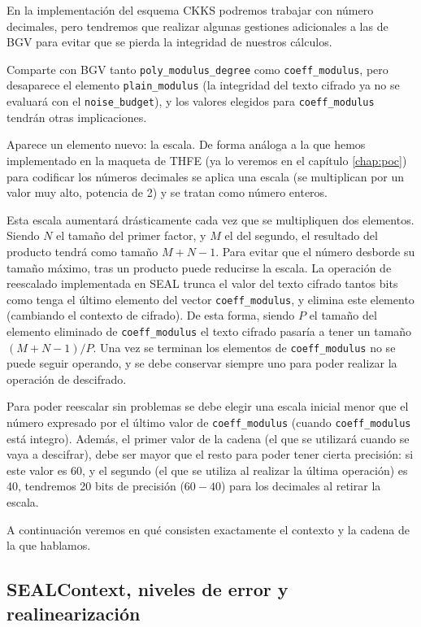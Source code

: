 En la implementación del esquema CKKS podremos trabajar con número decimales, pero tendremos que realizar algunas gestiones adicionales a las de BGV para evitar que se pierda la integridad de nuestros cálculos.

Comparte con BGV tanto \verb|poly_modulus_degree| como \verb|coeff_modulus|, pero desaparece el elemento \verb|plain_modulus| (la integridad del texto cifrado ya no se evaluará con el \verb|noise_budget|), y los valores elegidos para \verb|coeff_modulus| tendrán otras implicaciones.

Aparece un elemento nuevo: la escala. De forma análoga a la que hemos implementado en la maqueta de THFE (ya lo veremos en el capítulo \ref{chap:poc}) para codificar los números decimales se aplica una escala (se multiplican por un valor muy alto, potencia de 2) y se tratan como número enteros.

Esta escala aumentará drásticamente cada vez que se multipliquen dos elementos. Siendo $N$ el tamaño del primer factor, y $M$ el del segundo, el resultado del producto tendrá como tamaño $M+N-1$. Para evitar que el número desborde su tamaño máximo, tras un producto puede reducirse la escala. La operación de reescalado implementada en SEAL trunca el valor del texto cifrado tantos bits como tenga el último elemento del vector \verb|coeff_modulus|, y elimina este elemento (cambiando el contexto de cifrado). De esta forma, siendo $P$ el tamaño del elemento eliminado de \verb|coeff_modulus| el texto cifrado pasaría a tener un tamaño $(M+N-1)/P$. Una vez se terminan los elementos de \verb|coeff_modulus| no se puede seguir operando, y se debe conservar siempre uno para poder realizar la operación de descifrado.

Para poder reescalar sin problemas se debe elegir una escala inicial menor que el número expresado por el último valor de \verb|coeff_modulus| (cuando \verb|coeff_modulus| está integro). Además, el primer valor de la cadena (el que se utilizará cuando se vaya a descifrar), debe ser mayor que el resto para poder tener cierta precisión: si este valor es 60, y el segundo (el que se utiliza al realizar la última operación) es 40, tendremos 20 bits de precisión ($60 - 40$) para los decimales al retirar la escala.

A continuación veremos en qué consisten exactamente el contexto y la cadena de la que hablamos.

\subsection{SEALContext, niveles de error y realinearización}

